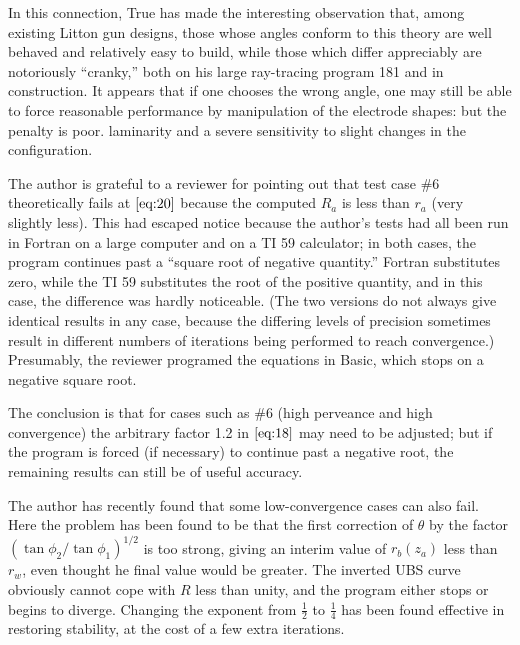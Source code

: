 \documentclass[10pt,a4paper,UTF8,fleqn]{article}
\begin{document}
In this connection, True has made the interesting observation that, among existing Litton gun designs, those whose angles conform to this theory are well behaved and relatively easy to build, while those which differ appreciably are notoriously ``cranky,'' both on his large ray-tracing program 181 and in construction. It appears that if one chooses the wrong angle, one may still be able to force reasonable performance by manipulation of the electrode shapes: but the penalty is poor. laminarity and a severe sensitivity to slight changes in the configuration.

The author is grateful to a reviewer for pointing out that test case \#6 theoretically fails at $ \eqref{eq:20} $ because the computed $ R_a $ is less than $ r_a $ (very slightly less). This had escaped notice because the author’s tests had all been run in Fortran on a large computer and on a TI 59 calculator; in both cases, the program continues past a ``square root of negative quantity.'' Fortran substitutes zero, while the TI 59 substitutes the root of the positive quantity, and in this case, the difference was hardly noticeable. (The two versions do not always give identical results in any case, because the differing levels of precision sometimes result in different numbers of iterations being performed to reach convergence.) Presumably, the reviewer programed the equations in Basic, which stops on a negative square root.




The conclusion is that for cases such as \#6 (high perveance and high convergence) the arbitrary factor 1.2 in $ \eqref{eq:18} $ may need to be adjusted; but if the program is forced (if necessary) to continue past a negative root, the remaining results can still be of useful accuracy.




The author has recently found that some low-convergence cases can also fail. Here the problem has been found to be that the first correction of $ \theta $ by the factor $ (\tan\phi_2/\tan\phi_1)^{1/2} $ is too strong, giving an interim value of $ r_b(z_a) $ less than $ r_w $, even thought he final value would be greater. The inverted UBS curve obviously cannot cope with $ R $ less than unity, and the program either stops or begins to diverge. Changing the exponent from $ \frac{1}{2} $ to $ \frac{1}{4} $ has been found effective in restoring stability, at the cost of a few extra iterations.




\renewcommand{\thefootnote}{{$ ^* $}}
\end{document}
